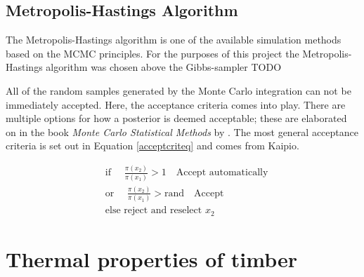 	

\subsection{Metropolis-Hastings Algorithm}

The Metropolis-Hastings algorithm is one of the available simulation methods based on the MCMC principles. 
For the purposes of this project the Metropolis-Hastings algorithm was chosen above the Gibbs-sampler TODO

All of the random samples generated by the Monte Carlo integration can not be immediately accepted.
	Here, the acceptance criteria comes into play.
	There are multiple options for how a posterior is deemed acceptable; these are elaborated on in the book  \textit{Monte Carlo Statistical Methods} by \citeauthor{Robert:2004}. 
	The most general acceptance criteria is set out in Equation \ref{acceptcriteq} and comes from Kaipio.
	
		\begin{equation} \label{acceptcriteq}
		\begin{aligned}
		&\text{if  }\quad \frac{\pi (x_2)}{\pi(x_1)} > 1 \quad \text{Accept automatically}\\
		&\text{or  }\quad \frac{\pi (x_2)}{\pi(x_1)} > \text{rand}  \quad \text{Accept}\\
		&\text{else reject and reselect  } x_2
		\end{aligned}
		\end{equation}

\section{Thermal properties of timber}
